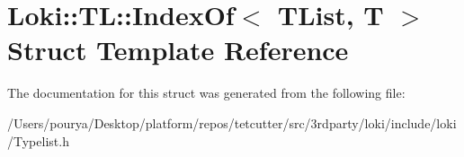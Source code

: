 \hypertarget{structLoki_1_1TL_1_1IndexOf}{}\section{Loki\+:\+:T\+L\+:\+:Index\+Of$<$ T\+List, T $>$ Struct Template Reference}
\label{structLoki_1_1TL_1_1IndexOf}


The documentation for this struct was generated from the following file\+:\begin{DoxyCompactItemize}
\item 
/\+Users/pourya/\+Desktop/platform/repos/tetcutter/src/3rdparty/loki/include/loki/Typelist.\+h\end{DoxyCompactItemize}
